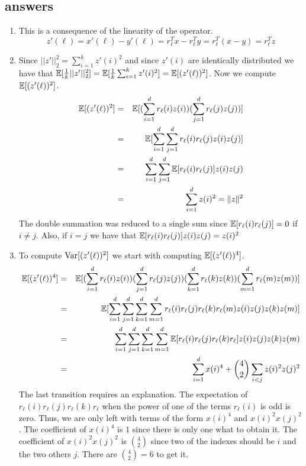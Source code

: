 \subsection*{answers}
\begin{enumerate}
\item This is a consequence of the linearity of the operator. 
\[
z'(\ell) = x'(\ell) - y'(\ell) = r_{\ell}^{T}x - r_{\ell}^{T}y = r_{\ell}^{T}(x-y) = r_{\ell}^{T}z 
\]
\item Since $||z'||_{2}^{2} = \sum_{i=1}^{k}z'(i)^2$ and since $z'(i)$ are identically distributed we have that 
${\mathbb E}[\frac{1}{k}||z'||_{2}^{2}] = {\mathbb E}[\frac{1}{k}\sum_{i=1}^{k}z'(i)^2] = {\mathbb E}[(z'(\ell))^2]$.
Now we compute ${\mathbb E}[(z'(\ell))^2]$.
\begin{eqnarray}
{\mathbb E}[(z'(\ell))^2] &=& {\mathbb E}[(\sum_{i=1}^{d} r_\ell(i) z(i))(\sum_{j=1}^{d} r_\ell(j) z(j))] \\
&=& {\mathbb E}[\sum_{i=1}^{d} \sum_{j=1}^{d} r_\ell(i) r_\ell(j)z(i) z(j)] \\
&=& \sum_{i=1}^{d} \sum_{j=1}^{d} {\mathbb E}[r_\ell(i) r_\ell(j)]z(i) z(j) \\
&=& \sum_{i=1}^{d} z(i)^2  = \|z\|^2
\end{eqnarray}
The double summation was reduced to a single sum since ${\mathbb E}[r_\ell(i)r_\ell(j)] = 0$ if $i \ne j$.
Also, if $i=j$ we have that ${\mathbb E}[r_\ell(i)r_\ell(j)]z(i)z(j) = z(i)^2$
\item To compute ${\operatorname{Var}}[(z'(\ell))^2]$ we start with computing ${\mathbb E}[(z'(\ell))^4]$.
\begin{eqnarray*}
{\mathbb E}[(z'(\ell))^4] &=& {\mathbb E}[(\sum_{i=1}^{d} r_\ell(i) z(i))(\sum_{j=1}^{d} r_\ell(j) z(j))(\sum_{k=1}^{d} r_\ell(k) z(k))(\sum_{m=1}^{d} r_\ell(m) z(m))] \\
&=& {\mathbb E}[\sum_{i=1}^{d}\sum_{j=1}^{d}\sum_{k=1}^{d}\sum_{m=1}^{d}r_\ell(i)r_\ell(j)r_\ell(k)r_\ell(m)z(i)z(j)z(k)z(m)] \\
&=& \sum_{i=1}^{d}\sum_{j=1}^{d}\sum_{k=1}^{d}\sum_{m=1}^{d} {\mathbb E}[r_\ell(i)r_\ell(j)r_\ell(k)r_\ell]z(i)z(j)z(k)z(m)\\
&=& \sum_{i=1}^{d}x(i)^4 + {4 \choose 2} \sum_{i<j}z(i)^2 z(j)^2
\end{eqnarray*}
The last transition requires an explanation. The expectation of $r_\ell(i)r_\ell(j)r_\ell(k)r_\ell$ when the power of one of 
the terms $r_\ell(i)$ is odd is zero. Thus, we are only left with terms of the form $x(i)^4$ and $x(i)^2 x(j)^2$.
The coefficient of $x(i)^4$ is $1$ since there is only one what to obtain it. The coefficient of $x(i)^2 x(j)^2$ is ${4 \choose 2}$
since two of the indexes should be $i$ and the two others $j$. There are ${4 \choose 2} = 6$ to get it.

\end{enumerate}
